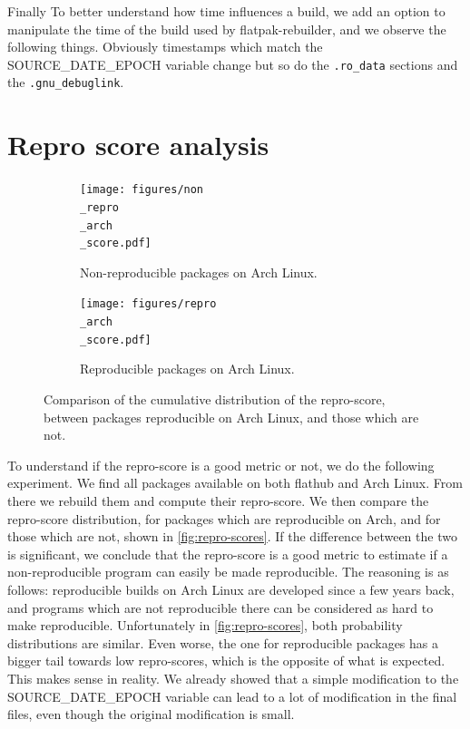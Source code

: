 \documentclass[a4paper,11pt,oneside]{report}
\theoremstyle{definition}
\newcommand{\sysname}{flatpak-rebuilder\xspace}
\newcommand{\rb}{reproducible builds\xspace}
\newcommand{\fh}{flathub\xspace}
\newcommand{\sde}{SOURCE\_DATE\_EPOCH\xspace}
\begin{document}
\noindent
Finally To better understand how time influences a build, we add an option to
manipulate the time of the build used by \sysname, and we observe the following
things. Obviously timestamps which match the \sde variable change but so do the
\verb|.ro_data| sections and the \verb|.gnu_debuglink|.

\section{Repro score analysis}
\label{sec:reprscore}
\begin{figure}[h]
\centering
\begin{subfigure}{.5\textwidth}
  \centering
  \texttt{[image: figures/non\\\_repro\\\_arch\\\_score.pdf]}
  \caption{Non-reproducible packages on Arch Linux.}
  \label{fig:sub1}
\end{subfigure}%
\begin{subfigure}{.5\textwidth}
  \centering
  \texttt{[image: figures/repro\\\_arch\\\_score.pdf]}
  \caption{Reproducible packages on Arch Linux.}
  \label{fig:sub2}
\end{subfigure}
\caption{Comparison of the cumulative distribution of the repro-score, between
    packages reproducible on Arch Linux, and those which are not.}
\label{fig:repro-scores}
\end{figure}

To understand if the repro-score is a good metric or not, we do the following
experiment. We find all packages available on both \fh and Arch Linux. From
there we rebuild them and compute their repro-score. We then compare the
repro-score distribution, for packages which are reproducible on Arch, and for
those which are not, shown in \autoref{fig:repro-scores}. If the difference
between the two is significant, we conclude that the repro-score is a good
metric to estimate if a non-reproducible program can easily be made
reproducible. The reasoning is as follows: \rb on Arch Linux are developed
since a few years back, and programs which are not reproducible there can be
considered as hard to make reproducible. Unfortunately in
\autoref{fig:repro-scores}, both probability distributions are similar. Even
worse, the one for reproducible packages has a bigger tail towards low
repro-scores, which is the opposite of what is expected. This makes sense in
reality. We already showed that a simple modification to the \sde variable can
lead to a lot of modification in the final files, even though the original
modification is small.
\end{document}
